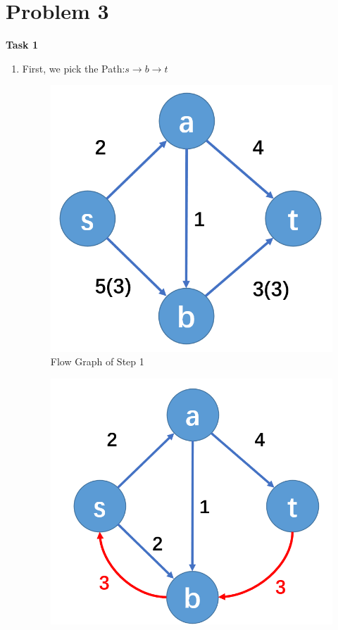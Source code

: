 \documentclass[a4paper]{article}
\begin{document}
\section{Problem 3}
\textbf{Task 1}
\begin{enumerate}
    \item First, we pick the Path:$s\rightarrow b\rightarrow t$
    \begin{figure}[H]
        \centering
        \includegraphics[scale=0.25]{P2.png}
        \caption{Flow Graph of Step 1}
    \end{figure}
    \begin{figure}[H]
        \centering
        \includegraphics[scale=0.25]{P3.png}

\end{figure}
\end{enumerate}
\end{document}
